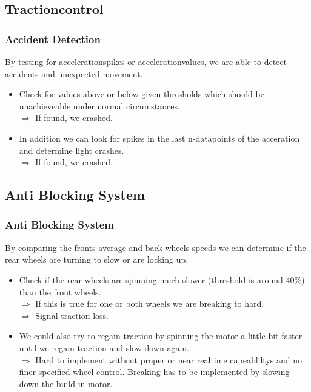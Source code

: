 \documentclass{beamer}
\begin{document}
\subsection{Tractioncontrol}
\begin{frame}
    \frametitle{Accident Detection}
    By testing for accelerationspikes or accelerationvalues, we are able to detect accidents and unexpected movement.\\
    \begin{itemize}
     \item Check for values above or below given thresholds which should be unachieveable under normal circumstances.\\
     $\Rightarrow$ If found, we crashed.
     \pause
     \item In addition we can look for spikes in the last n-datapoints of the acceration and determine light crashes.\\
     $\Rightarrow$ If found, we crashed.
     \pause
    \end{itemize}
\end{frame}
\subsection{Anti Blocking System}
\begin{frame}
    \frametitle{Anti Blocking System}
    By comparing the fronts average and back wheels speeds we can determine if the rear wheels are turning to slow or are locking up. 
    \begin{itemize}
     \item Check if the rear wheels are spinning much slower (threshold is around 40\%) than the front wheels.\\
     $\Rightarrow$ If this is true for one or both wheels we are breaking to hard.\\
     $\Rightarrow$ Signal traction loss.
     \pause
     \item We could also try to regain traction by spinning the motor a little bit faster until we regain traction and slow down again.\\
     $\Rightarrow$ Hard to implement without proper or near realtime capeabliltys and no finer specified wheel control. Breaking has to be implemented by slowing down the build in motor. \\
     \pause
    \end{itemize}
\end{frame}
\end{document}
